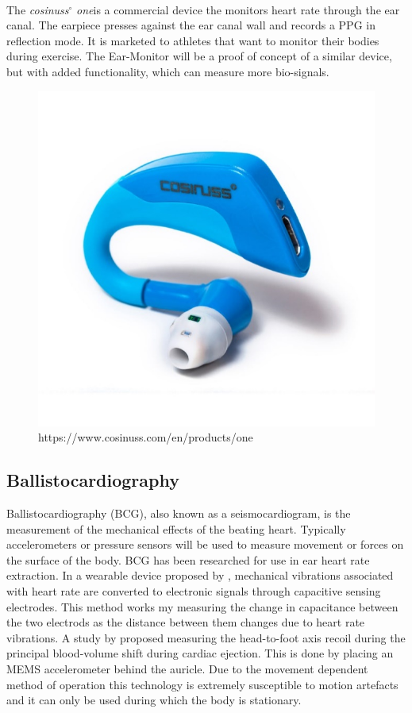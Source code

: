 \medskip

The \textit{cosinuss}$^{\circ}$ \textit{one}\textsuperscript \textregistered is a commercial device the monitors heart rate through the ear canal. The earpiece presses against the ear canal wall and records a PPG in reflection mode. It is marketed to athletes that want to monitor their bodies during exercise. The Ear-Monitor will be a proof of concept of a similar device, but with added functionality, which can measure more bio-signals.

\medskip

\begin{figure}[h]
   \centering
   \includegraphics[scale=0.8]{figs/cosinuss}
   \caption{https://www.cosinuss.com/en/products/one}
   \label{fig:cosinuss}
\end{figure}


\subsection{Ballistocardiography}
Ballistocardiography (BCG), also known as a seismocardiogram, is the measurement of the mechanical effects of the beating heart. Typically accelerometers or pressure sensors will be used to measure movement or forces on the surface of the body. BCG has been researched for use in ear heart rate extraction. In a wearable device proposed by \cite{da2010ear}, mechanical vibrations associated with heart rate are converted to electronic signals through capacitive sensing electrodes. This method works my measuring the change in capacitance between the two electrods as the distance between them changes due to heart rate vibrations. A study by \cite{winokur2012wearable} proposed measuring the head-to-foot axis recoil during the principal blood-volume shift during cardiac ejection. This is done by placing an MEMS accelerometer behind the auricle. Due to the movement dependent method of operation this technology is extremely susceptible to motion artefacts and it can only be used during which the body is stationary.


